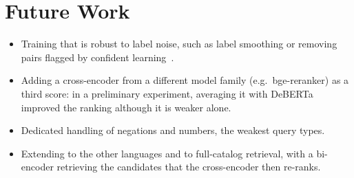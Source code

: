 \documentclass[12pt,a4paper]{report}
\begin{document}
\section{Future Work}
\begin{itemize}
  \item Training that is robust to label noise, such as label smoothing or removing pairs flagged by confident learning~\cite{cleanlab}.
  \item Adding a cross-encoder from a different model family (e.g.\ bge-reranker) as a third score: in a preliminary experiment, averaging it with DeBERTa improved the ranking although it is weaker alone.
  \item Dedicated handling of negations and numbers, the weakest query types.
  \item Extending to the other languages and to full-catalog retrieval, with a bi-encoder retrieving the candidates that the cross-encoder then re-ranks.
\end{itemize}
\end{document}
